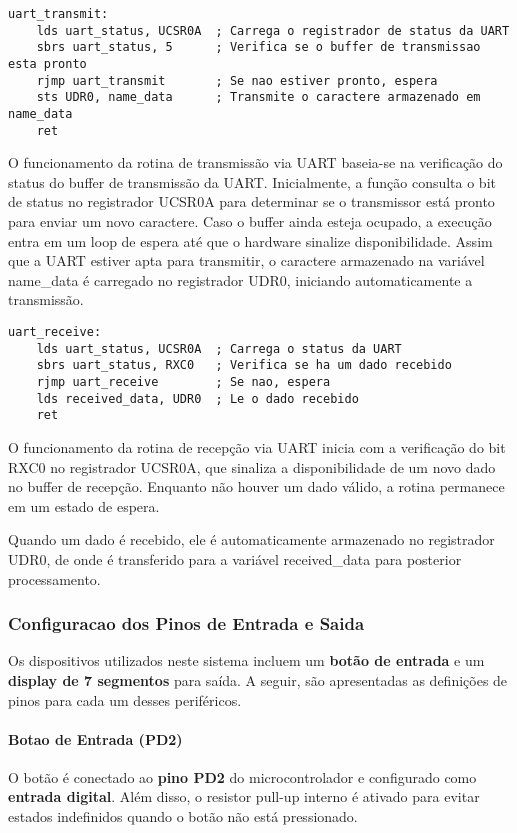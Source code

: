 \documentclass{sbrt}
\begin{document}
\begin{lstlisting}[style=assemblyStyle, caption={Rotina de Transmissão via UART}, label={lst:uart_transmit}]
uart_transmit:
	lds uart_status, UCSR0A  ; Carrega o registrador de status da UART
	sbrs uart_status, 5      ; Verifica se o buffer de transmissao esta pronto
	rjmp uart_transmit       ; Se nao estiver pronto, espera
	sts UDR0, name_data      ; Transmite o caractere armazenado em name_data
	ret
\end{lstlisting}
O funcionamento da rotina de transmissão via UART baseia-se na verificação do status do buffer de transmissão da UART. Inicialmente, a função consulta o bit de status no registrador UCSR0A para determinar se o transmissor está pronto para enviar um novo caractere. Caso o buffer ainda esteja ocupado, a execução entra em um loop de espera até que o hardware sinalize disponibilidade. Assim que a UART estiver apta para transmitir, o caractere armazenado na variável name\_data é carregado no registrador UDR0, iniciando automaticamente a transmissão.
\begin{lstlisting}[style=assemblyStyle, caption={Rotina de Recepção via UART}, label={lst:uart_receive}]
uart_receive:
	lds uart_status, UCSR0A  ; Carrega o status da UART
	sbrs uart_status, RXC0   ; Verifica se ha um dado recebido
	rjmp uart_receive        ; Se nao, espera
	lds received_data, UDR0  ; Le o dado recebido
	ret
\end{lstlisting}
O funcionamento da rotina de recepção via UART inicia com a verificação do bit RXC0 no registrador UCSR0A, que sinaliza a disponibilidade de um novo dado no buffer de recepção. Enquanto não houver um dado válido, a rotina permanece em um estado de espera.

Quando um dado é recebido, ele é automaticamente armazenado no registrador UDR0, de onde é transferido para a variável received\_data para posterior processamento.

\subsubsection{Configuracao dos Pinos de Entrada e Saida}

Os dispositivos utilizados neste sistema incluem um \textbf{botão de entrada} e um \textbf{display de 7 segmentos} para saída. A seguir, são apresentadas as definições de pinos para cada um desses periféricos.

\paragraph{Botao de Entrada (PD2)}
O botão é conectado ao \textbf{pino PD2} do microcontrolador e configurado como \textbf{entrada digital}. Além disso, o resistor pull-up interno é ativado para evitar estados indefinidos quando o botão não está pressionado.
\end{document}
